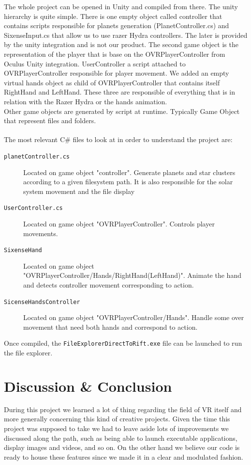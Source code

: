 \documentclass[paper=a4, fontsize=11pt]{scrartcl} %
\numberwithin{equation}{section} %
\numberwithin{figure}{section} %
\numberwithin{table}{section} %
\begin{document}
	
	The whole project can be opened in Unity and compiled from there.
	The unity hierarchy is quite simple. There is one empty object called controller that contains scripts responsible for planets generation (PlanetController.cs) and SixenseInput.cs that allow us to use razer Hydra controllers. The later is provided by the unity integration and is not our product. The second game object is the representation of the player that is base on the OVRPlayerController from Oculus Unity integration. UserController a script attached to OVRPlayerController responsible for player movement. We added an empty virtual hands object as child of OVRPlayerController that contains itself RightHand and LeftHand. These three are responsible of everything that is in relation with the Razer Hydra or the hands animation.\\
	Other game objects are generated by script at runtime. Typically Game Object that represent files and folders.\\\\
	The most relevant C\# files to look at in order to understand the project are:
	\begin{description}
		\item[\texttt{planetController.cs}] Located on game object "controller". Generate planets and star clusters according to a given filesystem path. It is also responsible for the solar system movement and the file display 
		\item[\texttt{UserController.cs}] Located on game object "OVRPlayerController". Controls player movements.
		\item[\texttt{SixenseHand}] Located on game object "OVRPlayerController/Hands/RightHand(LeftHand)". Animate the hand and detects controller movement corresponding to action.
		\item[\texttt{SicenseHandsController}] Located on game object "OVRPlayerController/Hands". Handle some over movement that need both hands and correspond to action.
	\end{description}
	
	Once compiled, the \texttt{FileExplorerDirectToRift.exe} file can be launched to run the file explorer.
	

\section{Discussion \& Conclusion}

During this project we learned a lot of thing regarding the field of VR itself and more generally concerning this kind of creative projects. Given the time this project was supposed to take we had to leave aside lots of improvements we discussed along the path, such as being able to launch executable applications, display images and videos, and so on. On the other hand we believe our code is ready to house these features since we made it in a clear and modulated fashion.
\end{document}
